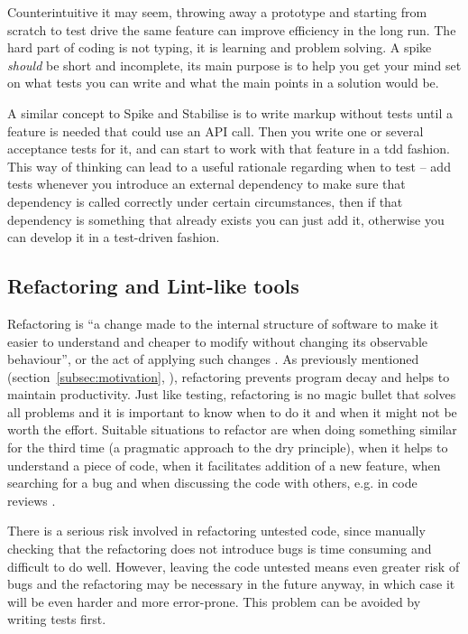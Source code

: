 \documentclass[11pt]{article}
\begin{document}
Counterintuitive it may seem, throwing away a prototype and starting from scratch to test drive the same feature can improve efficiency in the long run. The hard part of coding is not typing, it is learning and problem solving. A spike \emph{should} be short and incomplete, its main purpose is to help you get your mind set on what tests you can write and what the main points in a solution would be. \cite[question~60]{Edelstam}

A similar concept to Spike and Stabilise is to write markup without tests until a feature is needed that could use an API call. Then you write one or several acceptance tests for it, and can start to work with that feature in a \gls{tdd} fashion. \cite[question~30]{Ahnve} %
This way of thinking can lead to a useful rationale regarding when to test -- add tests whenever you introduce an external dependency to make sure that dependency is called correctly under certain circumstances, then if that dependency is something that already exists you can just add it, otherwise you can develop it in a test-driven fashion.

\subsection{Refactoring and Lint-like tools}
\label{subsec:refactor}

Refactoring is ``a change made to the internal structure of software to make it easier to understand and cheaper to modify without changing its observable behaviour'', or the act of applying such changes \cite[p.~46]{Refactoring}. As previously mentioned (section~\ref{subsec:motivation}, ), refactoring prevents program decay and helps to maintain productivity. Just like testing, refactoring is no magic bullet that solves all problems and it is important to know when to do it and when it might not be worth the effort. Suitable situations to refactor are when doing something similar for the third time (a pragmatic approach to the \gls{dry} principle), when it helps to understand a piece of code, when it facilitates addition of a new feature, when searching for a bug and when discussing the code with others, e.g. in code reviews \cite[p.~49-51]{Refactoring}.

There is a serious risk involved in refactoring untested code\cite[p.~17]{Refactoring}, since manually checking that the refactoring does not introduce bugs is time consuming and difficult to do well. However, leaving the code untested means even greater risk of bugs and the refactoring may be necessary in the future anyway, in which case it will be even harder and more error-prone. This problem can be avoided by writing tests first.
\end{document}
